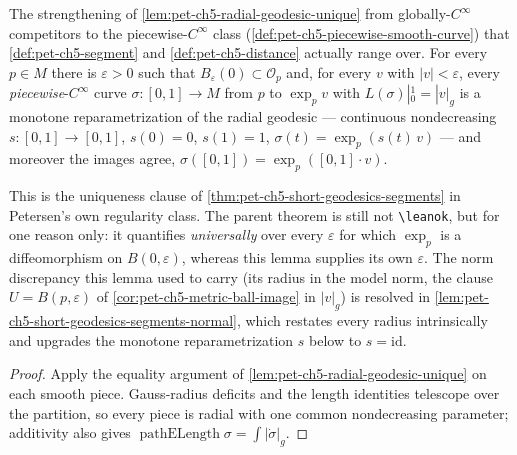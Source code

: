 \begin{lemma}
  \label{lem:pet-ch5-radial-geodesic-unique-piecewise}


  The strengthening of \cref{lem:pet-ch5-radial-geodesic-unique} from
  globally-$C^\infty$ competitors to the piecewise-$C^\infty$ class
  (\cref{def:pet-ch5-piecewise-smooth-curve}) that
  \cref{def:pet-ch5-segment} and \cref{def:pet-ch5-distance} actually range over.
  For every
  $p\in M$ there is $\varepsilon>0$ such that $B_\varepsilon(0)\subset\mathcal
  O_p$ and, for every $v$ with $|v|<\varepsilon$, every \emph{piecewise}-$C^\infty$
  curve $\sigma:[0,1]\to M$ from $p$ to $\exp_p v$ with
  $L(\sigma)|_0^1=|v|_g$ is a monotone reparametrization of the radial geodesic —
  continuous nondecreasing $s:[0,1]\to[0,1]$, $s(0)=0$, $s(1)=1$,
  $\sigma(t)=\exp_p(s(t)\,v)$ — and moreover the images agree,
  $\sigma([0,1])=\exp_p([0,1]\cdot v)$.

  This is the uniqueness clause of \cref{thm:pet-ch5-short-geodesics-segments} in
  Petersen's own regularity class. The parent theorem is still not
  \texttt{\textbackslash leanok}, but for one reason only: it quantifies
  \emph{universally} over every $\varepsilon$ for which $\exp_p$ is a
  diffeomorphism on $B(0,\varepsilon)$, whereas this lemma supplies its own
  $\varepsilon$.  The norm discrepancy this lemma used to carry (its radius in the
  model norm, the clause $U=B(p,\varepsilon)$ of
  \cref{cor:pet-ch5-metric-ball-image} in $|v|_g$) is resolved in
  \cref{lem:pet-ch5-short-geodesics-segments-normal}, which restates every radius
  intrinsically and upgrades the monotone reparametrization $s$ below to
  $s=\mathrm{id}$.
\end{lemma}
\begin{proof}

  \sketch
  Apply the equality argument of \cref{lem:pet-ch5-radial-geodesic-unique} on
  each smooth piece.  Gauss-radius deficits and the length identities telescope
  over the partition, so every piece is radial with one common nondecreasing
  parameter; additivity also gives
  $\operatorname{pathELength}\sigma=\int|\dot\sigma|_g$.
\end{proof}

